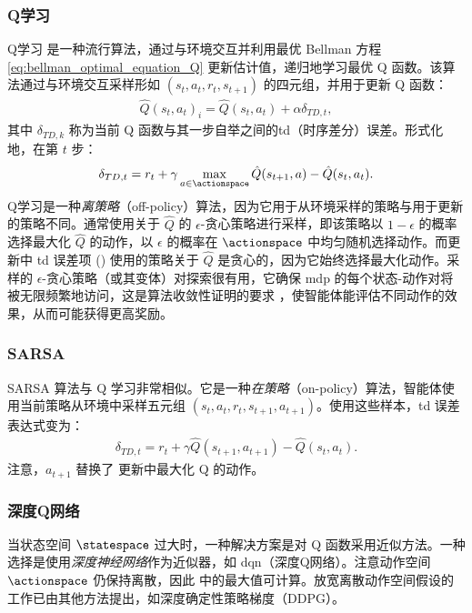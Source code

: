 \subsubsection{Q学习}
Q学习 \cite{watkins1989learning} 是一种流行算法，通过与环境交互并利用最优 Bellman 方程 \cref{eq:bellman_optimal_equation_Q} 更新估计值，递归地学习最优 Q 函数。该算法通过与环境交互采样形如 $(s_t,a_t,r_t,s_{t+1})$ 的四元组，并用于更新 Q 函数：
\begin{align}
\label{eq:update_q_learning}
    \hat Q(s_t, a_t)_i = \hat Q(s_t, a_t) + \alpha \delta_{TD,t},
\end{align}
其中 $\delta_{TD,k}$ 称为当前 Q 函数与其一步自举之间的\gls{td}（时序差分）误差。形式化地，在第 $t$ 步：
\begin{align}
\label{eq:td_error_q_learning}
    \delta_{TD,t} = r_t+\gamma \max_{a\in\actionspace} \hat Q(s_{t+1}, a) -\hat Q(s_t, a_t).
\end{align}
Q学习是一种\emph{离策略}（off-policy）算法，因为它用于从环境采样的策略与用于更新的策略不同。通常使用关于 $\hat{Q}$ 的 $\epsilon$-贪心策略进行采样，即该策略以 $1-\epsilon$ 的概率选择最大化 $\hat{Q}$ 的动作，以 $\epsilon$ 的概率在 $\actionspace$ 中均匀随机选择动作。而更新中 \gls{td} 误差项 () 使用的策略关于 $\hat Q$ 是贪心的，因为它始终选择最大化动作。采样的 $\epsilon$-贪心策略（或其变体）对探索很有用，它确保 \gls{mdp} 的每个状态-动作对将被无限频繁地访问，这是算法收敛性证明的要求 \cite{watkins1992q}，使智能体能评估不同动作的效果，从而可能获得更高奖励。

\subsubsection{SARSA}
SARSA \cite{rummery1994line} 算法与 Q 学习非常相似。它是一种\emph{在策略}（on-policy）算法，智能体使用当前策略从环境中采样五元组 $(s_t,a_t,r_t,s_{t+1},a_{t+1})$。使用这些样本，\gls{td} 误差表达式变为：
\begin{align*}
    \delta_{TD,t} = r_t+\gamma\hat Q(s_{t+1}, a_{t+1})-\hat Q(s_t, a_t).
\end{align*}
注意，$a_{t+1}$ 替换了  更新中最大化 Q 的动作。

\subsubsection{深度Q网络}
当状态空间 $\statespace$ 过大时，一种解决方案是对 Q 函数采用近似方法。一种选择是使用\emph{深度神经网络}作为近似器，如 \gls{dqn}（深度Q网络）\cite{mnih2013playing}。注意动作空间 $\actionspace$ 仍保持离散，因此  中的最大值可计算。放宽离散动作空间假设的工作已由其他方法提出，如深度确定性策略梯度（DDPG）\cite{lillicrap2015continuous}。

